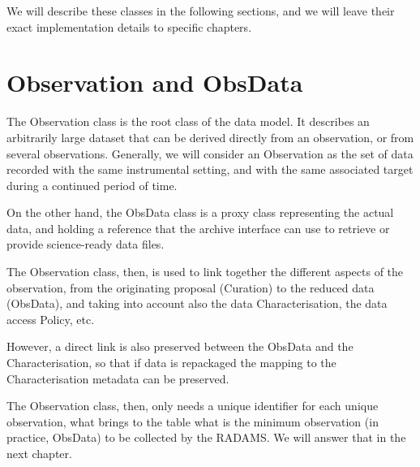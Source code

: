 		We will describe these classes in the following sections,
		and we will leave their exact implementation details to
		specific chapters.

	\section{Observation and ObsData} %
	\label{sec:observation_obsdata}

		The Observation class is the root class of the data model.
		It describes an arbitrarily large dataset that can be
		derived directly from an observation, or from several
		observations. Generally, we will consider an Observation as
		the set of data recorded with the same instrumental
		setting, and with the same associated target during a
		continued period of time.

		
		On the other hand, the ObsData class is a proxy class
		representing the actual data, and holding a reference that
		the archive interface can use to retrieve or provide
		science-ready data files.
		
		The Observation class, then, is used to link together
		the different aspects of the observation, from the
		originating proposal (Curation) to the reduced data
		(ObsData), and taking into account also the data
		Characterisation, the data access Policy, etc.
		
		However, a direct link is also preserved between the
		ObsData and the Characterisation, so that if data is
		repackaged the mapping to the Characterisation metadata can
		be preserved.
		
		The Observation class, then, only needs a unique identifier
		for each unique observation, what brings to the table what
		is the minimum observation (in practice, ObsData) to be
		collected by the RADAMS. We will answer that in the next
		chapter.
		
				

